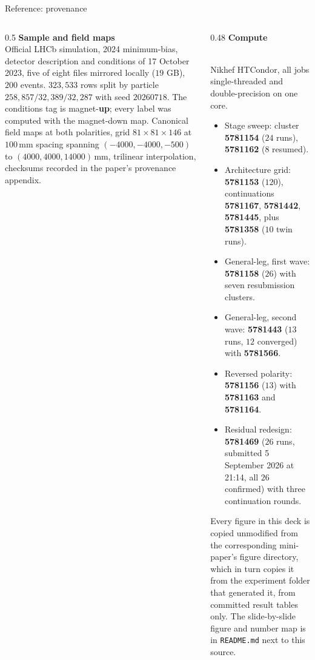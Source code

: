 \documentclass[aspectratio=169,10pt]{beamer}
\newcommand{\mm}{\ensuremath{\,\mathrm{mm}}}
\begin{document}
\begin{frame}[shrink=25]{Reference: provenance}
\begin{columns}[T]
\begin{column}{0.5\textwidth}
      \textbf{Sample and field maps}
      {\scriptsize\\ Official LHCb simulation, 2024 minimum-bias, detector
       description and conditions of 17 October 2023, five of eight files
       mirrored locally ($19$ GB), $200$ events. $323{,}533$ rows split by
       particle $258{,}857 / 32{,}389 / 32{,}287$ with seed $20260718$.
       The conditions tag is magnet-\textbf{up}; every label was computed with
       the magnet-down map.
       Canonical field maps at both polarities, grid $81 \times 81 \times 146$
       at $100\mm$ spacing spanning $(-4000, -4000, -500)$ to
       $(4000, 4000, 14000)\mm$, trilinear interpolation, checksums recorded in
       the paper's provenance appendix.}
    \end{column}
    \begin{column}{0.48\textwidth}
      \textbf{Compute}
      {\scriptsize\\ Nikhef HTCondor, all jobs single-threaded and
       double-precision on one core.
      \begin{itemize}
        \item Stage sweep: cluster \textbf{5781154} ($24$ runs), \textbf{5781162} ($8$ resumed).
        \item Architecture grid: \textbf{5781153} ($120$), continuations
              \textbf{5781167}, \textbf{5781442}, \textbf{5781445}, plus
              \textbf{5781358} ($10$ twin runs).
        \item General-leg, first wave: \textbf{5781158} ($26$) with seven
              resubmission clusters.
        \item General-leg, second wave: \textbf{5781443} ($13$ runs, $12$
              converged) with \textbf{5781566}.
        \item Reversed polarity: \textbf{5781156} ($13$) with \textbf{5781163}
              and \textbf{5781164}.
        \item Residual redesign: \textbf{5781469} ($26$ runs, submitted
              5 September 2026 at 21:14, all $26$ confirmed) with three
              continuation rounds.
      \end{itemize}}
      \vspace{1mm}

      {\scriptsize Every figure in this deck is copied unmodified from the
       corresponding mini-paper's figure directory, which in turn copies it from
       the experiment folder that generated it, from committed result tables
       only. The slide-by-slide figure and number map is in \texttt{README.md}
       next to this source.}
    \end{column}
  \end{columns}
\end{frame}
\end{document}
